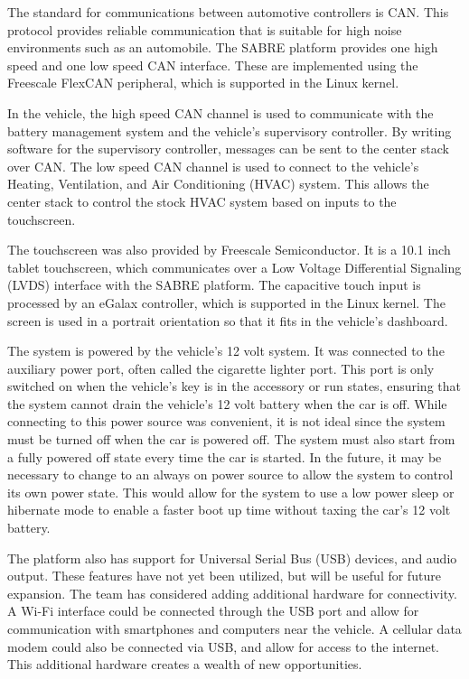 \documentclass[ece]{uw-wkrpt}
\begin{document}
The standard for communications between automotive controllers is CAN. This
protocol provides reliable communication that is suitable for high noise
environments such as an automobile. The SABRE platform provides one high speed
and one low speed CAN interface. These are implemented using the Freescale
FlexCAN peripheral, which is supported in the Linux kernel.

In the vehicle, the high speed CAN channel is used to communicate with the
battery management system and the vehicle's supervisory controller. By writing
software for the supervisory controller, messages can be sent to the center
stack over CAN. The low speed CAN channel is used to connect to the vehicle's
Heating, Ventilation, and Air Conditioning (HVAC) system. This allows the center
stack to control the stock HVAC system based on inputs to the touchscreen.

The touchscreen was also provided by Freescale Semiconductor. It is a 10.1 inch
tablet touchscreen, which communicates over a Low Voltage Differential Signaling
(LVDS) interface with the SABRE platform. The capacitive touch input is
processed by an eGalax controller, which is supported in the Linux kernel. The
screen is used in a portrait orientation so that it fits in the vehicle's
dashboard.

The system is powered by the vehicle's 12 volt system. It was connected to the
auxiliary power port, often called the cigarette lighter port. This port is
only switched on when the vehicle's key is in the accessory or run states,
ensuring that the system cannot drain the vehicle's 12 volt battery when the car
is off. While connecting to this power source was convenient, it is not ideal
since the system must be turned off when the car is powered off. The system must
also start from a fully powered off state every time the car is started. In the
future, it may be necessary to change to an always on power source to allow the 
system to control its own power state. This would allow for the system to use a 
low power sleep or hibernate mode to enable a faster boot up time without taxing 
the car's 12 volt battery.

The platform also has support for Universal Serial Bus (USB) devices, and audio
output. These features have not yet been utilized, but will be useful for future
expansion. The team has considered adding additional hardware for connectivity.
A Wi-Fi interface could be connected through the USB port and allow for
communication with smartphones and computers near the vehicle. A cellular data
modem could also be connected via USB, and allow for access to the internet.
This additional hardware creates a wealth of new opportunities.
\end{document}
